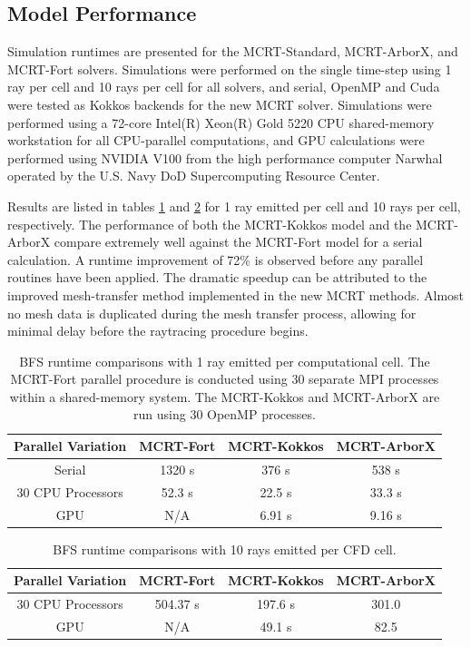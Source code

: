 \subsection{Model Performance}
Simulation runtimes are presented for the MCRT-Standard, MCRT-ArborX, and MCRT-Fort solvers. Simulations were performed on the single time-step using 1 ray per cell and 10 rays per cell for all solvers, and serial, OpenMP and Cuda were tested as Kokkos backends for the new MCRT solver. 
Simulations were performed using a 72-core Intel(R) Xeon(R) Gold 5220 CPU shared-memory workstation for all CPU-parallel computations, and GPU calculations were performed using NVIDIA V100 from the high performance computer Narwhal operated by the U.S. Navy DoD Supercomputing Resource Center.

Results are listed in tables \ref{table:BFS_runtime_table_1rpc} and \ref{table:BFS_runtime_table_10rpc} for 1 ray emitted per cell and 10 rays per cell, respectively. The performance of both the MCRT-Kokkos model and the MCRT-ArborX compare extremely well against the MCRT-Fort model for a serial calculation. A runtime improvement of 72\% is observed before any parallel routines have been applied.
The dramatic speedup can be attributed to the improved mesh-transfer method implemented in the new MCRT methods. 
Almost no mesh data is duplicated during the mesh transfer process, allowing for minimal delay before the raytracing procedure begins.

\begin{table}
\centering
\caption{BFS runtime comparisons with 1 ray emitted per computational cell. The MCRT-Fort parallel procedure is conducted using 30 separate MPI processes within a shared-memory system. The MCRT-Kokkos and MCRT-ArborX are run using 30 OpenMP processes.}
\begin{tabular}{c c c c} 
 \hline
 Parallel Variation & MCRT-Fort & MCRT-Kokkos & MCRT-ArborX \\ [0.5ex] 
 \hline
 Serial & 1320 s & 376 s & 538 s \\ 
 30 CPU Processors & 52.3 s & 22.5 s & 33.3 s \\
 GPU & N/A & 6.91 s & 9.16 s \\
 \hline
\end{tabular}
\label{table:BFS_runtime_table_1rpc}
\end{table}

\begin{table}
\centering
\caption{BFS runtime comparisons with 10 rays emitted per CFD cell.}
\begin{tabular}{c c c c} 
 \hline
 Parallel Variation & MCRT-Fort & MCRT-Kokkos & MCRT-ArborX \\ [0.5ex] 
 \hline
 30 CPU Processors & 504.37 s & 197.6 s & 301.0 \\
 GPU & N/A & 49.1 s & 82.5 \\
 \hline
\end{tabular}
\label{table:BFS_runtime_table_10rpc}
\end{table}


